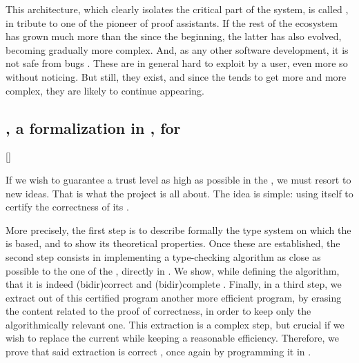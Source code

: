 This architecture, which clearly isolates the critical part of the system, is called
 , in tribute to one of the pioneer
of proof assistants.
If the rest of the ecosystem has grown much more than the  since the beginning,
the latter has also evolved, becoming gradually more complex.
And, as any other software development, it is not safe from bugs%
.
These are in general hard to exploit by a user, even more so without noticing.
But still, they exist, and since the  tends to get more and more complex, they
are likely to continue appearing.

\subsection{, a formalization in , for }[]

If we wish to guarantee a trust level as high as possible in the , we must
resort to new ideas. That is what the  project is all about. The idea
is simple: using  itself to certify the correctness of its .

More precisely, the first step is to describe formally the type system on which the 
is based, and to show its theoretical properties.
Once these are established, the second step
consists in implementing a type-checking algorithm as close as possible to the one of the
, directly in %
.
We show, while defining the algorithm, that it is indeed \reintro(bidir){correct}%
and \reintro(bidir){complete}%
.
Finally, in a third step, we extract out of this certified  program another
more efficient program, by erasing the content related to the proof of correctness, in order
to keep only the algorithmically relevant one.
This extraction is a complex step, but crucial if we wish to replace the current 
while keeping a reasonable efficiency. Therefore, we prove that said extraction
is correct%
,
once again by programming it in .

